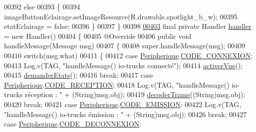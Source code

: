 \begin{DoxyCode}
00392         \textcolor{keywordflow}{else}
00393         \{
00394             imageButtonEclairage.setImageResource(R.drawable.spotlight\_b\_w);
00395             etatEclairage = \textcolor{keyword}{false};
00396         \}
00397     \}
00398 
\hyperlink{classcom_1_1lasalle_1_1io__trucks_1_1_main_activity_a16435e06fc13fa3938f40a1bd5e1eb0b}{00403}     \textcolor{keyword}{final} \textcolor{keyword}{private} Handler \hyperlink{classcom_1_1lasalle_1_1io__trucks_1_1_main_activity_a16435e06fc13fa3938f40a1bd5e1eb0b}{handler} = \textcolor{keyword}{new} Handler()
00404     \{
00405         @Override
00406         \textcolor{keyword}{public} \textcolor{keywordtype}{void} handleMessage(Message msg)
00407         \{
00408             super.handleMessage(msg);
00409 
00410             \textcolor{keywordflow}{switch}(msg.what)
00411             \{
00412                 \textcolor{keywordflow}{case} \hyperlink{classcom_1_1lasalle_1_1io__trucks_1_1_peripherique}{Peripherique}.\hyperlink{classcom_1_1lasalle_1_1io__trucks_1_1_peripherique_a46ce17bdb3396e4aee94ea06a0bd8556}{CODE\_CONNEXION}:
00413                     Log.v(TAG, \textcolor{stringliteral}{"handleMessage() io-trucks connecté"});
00414                     \hyperlink{classcom_1_1lasalle_1_1io__trucks_1_1_main_activity_a09f9deded45d212d479d2206ddf52749}{activerVue}();
00415                     \hyperlink{classcom_1_1lasalle_1_1io__trucks_1_1_main_activity_aa9cd705ec555f1a41d39172ad2e9fb61}{demanderEtats}();
00416                     \textcolor{keywordflow}{break};
00417                 \textcolor{keywordflow}{case} \hyperlink{classcom_1_1lasalle_1_1io__trucks_1_1_peripherique}{Peripherique}.\hyperlink{classcom_1_1lasalle_1_1io__trucks_1_1_peripherique_a2abb4880d1dd4140379b3ff71cff8cf3}{CODE\_RECEPTION}:
00418                     Log.v(TAG, \textcolor{stringliteral}{"handleMessage() io-trucks réception : "} + (String)msg.obj);
00419                     \hyperlink{classcom_1_1lasalle_1_1io__trucks_1_1_main_activity_afee6fb53a4414e7b577ea329fd473ba4}{decoderTrame}((String)msg.obj);
00420                     \textcolor{keywordflow}{break};
00421                 \textcolor{keywordflow}{case} \hyperlink{classcom_1_1lasalle_1_1io__trucks_1_1_peripherique}{Peripherique}.\hyperlink{classcom_1_1lasalle_1_1io__trucks_1_1_peripherique_aad9e383353fd86265a2eeeac2d2c901f}{CODE\_EMISSION}:
00422                     Log.v(TAG, \textcolor{stringliteral}{"handleMessage() io-trucks émission : "} + (String)msg.obj);
00426                     \textcolor{keywordflow}{break};
00427                 \textcolor{keywordflow}{case} \hyperlink{classcom_1_1lasalle_1_1io__trucks_1_1_peripherique}{Peripherique}.\hyperlink{classcom_1_1lasalle_1_1io__trucks_1_1_peripherique_a44d0841cdcad04f7d112cb30d12a60f0}{CODE\_DECONNEXION}:

\end{DoxyCode}
